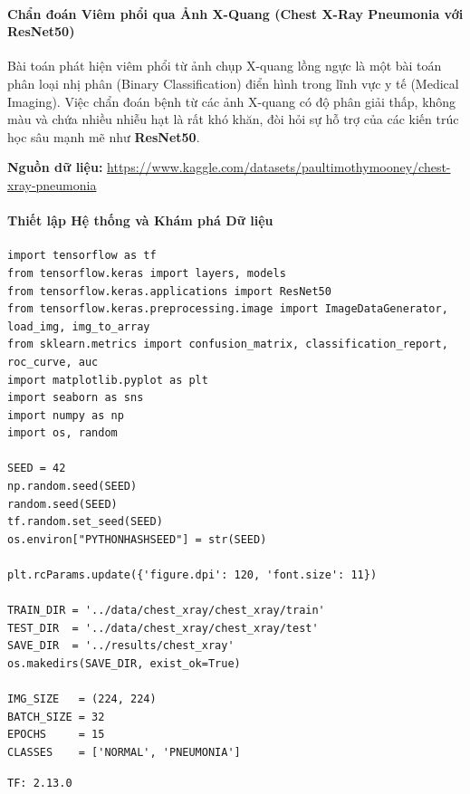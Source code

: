 \paragraph{Chẩn đoán Viêm phổi qua Ảnh X-Quang (Chest X-Ray Pneumonia với ResNet50)} \hfill\mbox{}

Bài toán phát hiện viêm phổi từ ảnh chụp X-quang lồng ngực là một bài toán phân loại nhị phân (Binary Classification) điển hình trong lĩnh vực y tế (Medical Imaging). Việc chẩn đoán bệnh từ các ảnh X-quang có độ phân giải thấp, không màu và chứa nhiều nhiễu hạt là rất khó khăn, đòi hỏi sự hỗ trợ của các kiến trúc học sâu mạnh mẽ như \textbf{ResNet50}.

\begin{center}
    \textbf{Nguồn dữ liệu:} \url{https://www.kaggle.com/datasets/paultimothymooney/chest-xray-pneumonia}
\end{center}

\paragraph{Thiết lập Hệ thống và Khám phá Dữ liệu} \hfill\mbox{}

\begin{lstlisting}[style=pythoncode, caption={Khởi tạo môi trường TensorFlow và siêu tham số}]
import tensorflow as tf
from tensorflow.keras import layers, models
from tensorflow.keras.applications import ResNet50
from tensorflow.keras.preprocessing.image import ImageDataGenerator, load_img, img_to_array
from sklearn.metrics import confusion_matrix, classification_report, roc_curve, auc
import matplotlib.pyplot as plt
import seaborn as sns
import numpy as np
import os, random

SEED = 42
np.random.seed(SEED)
random.seed(SEED)
tf.random.set_seed(SEED)
os.environ["PYTHONHASHSEED"] = str(SEED)

plt.rcParams.update({'figure.dpi': 120, 'font.size': 11})

TRAIN_DIR = '../data/chest_xray/chest_xray/train'
TEST_DIR  = '../data/chest_xray/chest_xray/test'
SAVE_DIR  = '../results/chest_xray'
os.makedirs(SAVE_DIR, exist_ok=True)

IMG_SIZE   = (224, 224)
BATCH_SIZE = 32
EPOCHS     = 15
CLASSES    = ['NORMAL', 'PNEUMONIA']
\end{lstlisting}

\begin{lstlisting}[style=consoleoutput, caption={Output: Phiên bản TensorFlow}]
TF: 2.13.0
\end{lstlisting}

